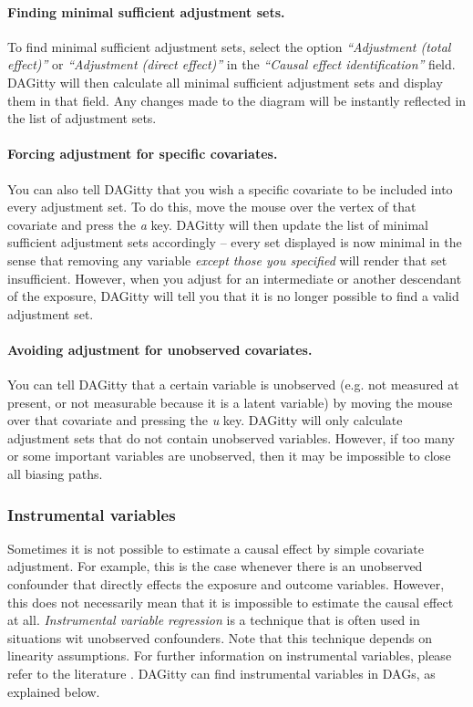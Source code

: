\documentclass[a4paper]{article} %
\newcommand{\pp}{DAGitty\xspace}
\newcommand{\action}[1]{\emph{``#1''}}
\begin{document}
\paragraph{Finding minimal sufficient adjustment sets.}

To find minimal sufficient adjustment sets, select the 
option \action{Adjustment (total effect)}
or \action{Adjustment (direct effect)} in the 
\action{Causal effect identification} field. 
\pp
will then calculate all minimal sufficient adjustment sets and display 
them in that field. Any changes made to the diagram will be instantly
reflected in the list of adjustment sets.

\paragraph{Forcing adjustment for specific covariates.}

You can also tell \pp that you wish a specific covariate
to be included into every adjustment set. To do this, move the
mouse over the vertex of that covariate and press the \emph{a} 
key. \pp will then update the list of minimal sufficient
adjustment sets accordingly -- every set displayed
is now minimal in the sense that removing any variable 
\emph{except those you specified} will render
that set insufficient. However, when you adjust for an intermediate
or another descendant of the exposure, \pp will tell you that it is no longer
possible to find a valid adjustment set.

\paragraph{Avoiding adjustment for unobserved covariates.}

You can tell \pp that a certain variable is unobserved 
(e.g. not measured at present, or not measurable because it is a 
latent variable) by moving the mouse 
over that covariate and pressing the \emph{u} key.
\pp will only calculate adjustment sets that do 
not contain unobserved variables. However, if too many or
some important variables are unobserved, then it may
be impossible to close all biasing paths. 

\subsubsection{Instrumental variables}

Sometimes it is not possible to estimate a causal effect by simple covariate adjustment.
For example, this is the case whenever there is an unobserved confounder that directly
effects the exposure and outcome variables. However, this does not necessarily 
mean that it is impossible to estimate the causal effect at all. 
\emph{Instrumental variable regression} is a technique that is 
often used in situations wit unobserved confounders.
Note that this technique depends on linearity assumptions. For further information
on instrumental variables, please refer to the literature \cite{AngristIR96,imbens14}. 
\pp can find instrumental variables in DAGs, as explained below. 
\end{document}
